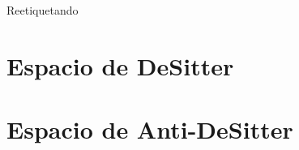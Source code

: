 \documentclass[../main]{subfiles}
\begin{document}
\begin{adjustwidth}{0pt}{-100pt}
Reetiquetando 

\section{Espacio de DeSitter}\label{part5.6}

\section{Espacio de Anti-DeSitter}\label{part5.7}

\end{adjustwidth}
\end{document}
